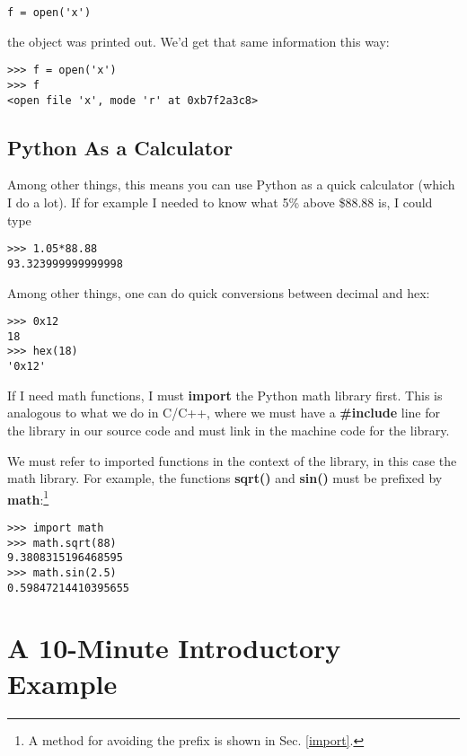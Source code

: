 \begin{Verbatim}[fontsize=\relsize{-2}]
f = open('x')
\end{Verbatim}

the object was printed out.  We'd get that same information this way:

\begin{Verbatim}[fontsize=\relsize{-2}]
>>> f = open('x')
>>> f
<open file 'x', mode 'r' at 0xb7f2a3c8>
\end{Verbatim}

\subsection{Python As a Calculator} 

Among other things, this means you can use Python as a quick calculator
(which I do a lot).  If for example I needed to know what 5\% above
\$88.88 is, I could type

\begin{Verbatim}[fontsize=\relsize{-2}]
% python
>>> 1.05*88.88
93.323999999999998
\end{Verbatim}

Among other things, one can do quick conversions between decimal and
hex:

\begin{Verbatim}[fontsize=\relsize{-2}]
>>> 0x12
18
>>> hex(18)
'0x12'
\end{Verbatim}

If I need math functions, I must {\bf import} the Python math library
first.  This is analogous to what we do in C/C++, where we must have a
{\bf \#include} line for the library in our source code and must link in
the machine code for the library.  

We must refer to imported functions in the context of the library, in
this case the math library.  For example, the functions {\bf sqrt()} and
{\bf sin()} must be prefixed by {\bf math}:\footnote{A method for
avoiding the prefix is shown in Sec.  \ref{import}.}

\begin{Verbatim}[fontsize=\relsize{-2}]
>>> import math
>>> math.sqrt(88)
9.3808315196468595
>>> math.sin(2.5)
0.59847214410395655
\end{Verbatim}

\section{A 10-Minute Introductory Example}
\label{tenmin}

